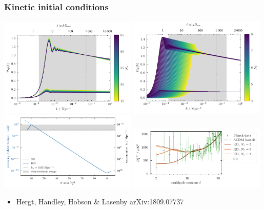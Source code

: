 \documentclass[%
]{beamer}
\begin{document}
\begin{frame}
    \frametitle{Kinetic initial conditions}
    \includegraphics[width=0.49\textwidth]{pps_Nstar}
    \includegraphics[width=0.49\textwidth]{pps_Ndagg}
    \includegraphics[width=0.49\textwidth]{hubble}
    \includegraphics[width=0.49\textwidth]{cmb_KD_Ndagg}
    \begin{itemize}
        \item Hergt, Handley, Hobson \& Lasenby arXiv:1809.07737
    \end{itemize}
\end{frame}
\end{document}
